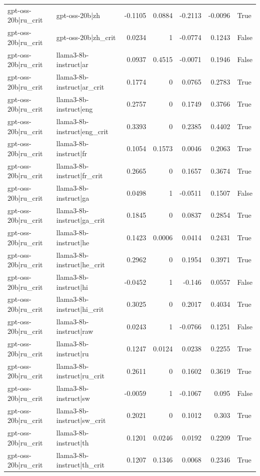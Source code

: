 \begin{table}
\begin{tabular}{l l r r r r l}
gpt-oss-20b|ru_crit & gpt-oss-20b|zh & -0.1105 & 0.0884 & -0.2113 & -0.0096 & True \\
gpt-oss-20b|ru_crit & gpt-oss-20b|zh_crit & 0.0234 & 1 & -0.0774 & 0.1243 & False \\
gpt-oss-20b|ru_crit & llama3-8b-instruct|ar & 0.0937 & 0.4515 & -0.0071 & 0.1946 & False \\
gpt-oss-20b|ru_crit & llama3-8b-instruct|ar_crit & 0.1774 & 0 & 0.0765 & 0.2783 & True \\
gpt-oss-20b|ru_crit & llama3-8b-instruct|eng & 0.2757 & 0 & 0.1749 & 0.3766 & True \\
gpt-oss-20b|ru_crit & llama3-8b-instruct|eng_crit & 0.3393 & 0 & 0.2385 & 0.4402 & True \\
gpt-oss-20b|ru_crit & llama3-8b-instruct|fr & 0.1054 & 0.1573 & 0.0046 & 0.2063 & True \\
gpt-oss-20b|ru_crit & llama3-8b-instruct|fr_crit & 0.2665 & 0 & 0.1657 & 0.3674 & True \\
gpt-oss-20b|ru_crit & llama3-8b-instruct|ga & 0.0498 & 1 & -0.0511 & 0.1507 & False \\
gpt-oss-20b|ru_crit & llama3-8b-instruct|ga_crit & 0.1845 & 0 & 0.0837 & 0.2854 & True \\
gpt-oss-20b|ru_crit & llama3-8b-instruct|he & 0.1423 & 0.0006 & 0.0414 & 0.2431 & True \\
gpt-oss-20b|ru_crit & llama3-8b-instruct|he_crit & 0.2962 & 0 & 0.1954 & 0.3971 & True \\
gpt-oss-20b|ru_crit & llama3-8b-instruct|hi & -0.0452 & 1 & -0.146 & 0.0557 & False \\
gpt-oss-20b|ru_crit & llama3-8b-instruct|hi_crit & 0.3025 & 0 & 0.2017 & 0.4034 & True \\
gpt-oss-20b|ru_crit & llama3-8b-instruct|raw & 0.0243 & 1 & -0.0766 & 0.1251 & False \\
gpt-oss-20b|ru_crit & llama3-8b-instruct|ru & 0.1247 & 0.0124 & 0.0238 & 0.2255 & True \\
gpt-oss-20b|ru_crit & llama3-8b-instruct|ru_crit & 0.2611 & 0 & 0.1602 & 0.3619 & True \\
gpt-oss-20b|ru_crit & llama3-8b-instruct|sw & -0.0059 & 1 & -0.1067 & 0.095 & False \\
gpt-oss-20b|ru_crit & llama3-8b-instruct|sw_crit & 0.2021 & 0 & 0.1012 & 0.303 & True \\
gpt-oss-20b|ru_crit & llama3-8b-instruct|th & 0.1201 & 0.0246 & 0.0192 & 0.2209 & True \\
gpt-oss-20b|ru_crit & llama3-8b-instruct|th_crit & 0.1207 & 0.1346 & 0.0068 & 0.2346 & True \\

\end{tabular}
\end{table}
